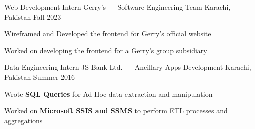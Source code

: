 \begin{cventries}
\cventry
{Web Development Intern} %
  {Gerry's --- Software Engineering Team} %
{Karachi, Pakistan} %
{Fall 2023} %
{%
  \begin{cvitems}
  \item {Wireframed and Developed the frontend for Gerry's official website}
  \item {Worked on developing the frontend for a Gerry's group subsidiary}
  \end{cvitems}
}

\vspace{\myspacing}

\cventry
{Data Engineering Intern} %
{JS Bank Ltd. --- Ancillary Apps Development} %
{Karachi, Pakistan} %
{Summer 2016} %
{%
  \begin{cvitems}
  \item {Wrote \textbf{SQL Queries} for Ad Hoc data extraction and manipulation}
  \item {Worked on \textbf{Microsoft SSIS and SSMS} to perform ETL processes and aggregations}
  \end{cvitems}
}

\vspace{\myspacing}


\end{cventries}
